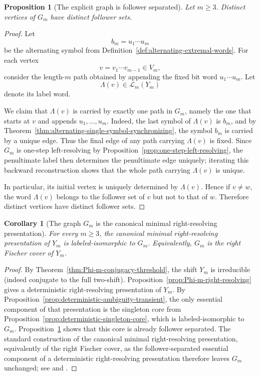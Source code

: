 \documentclass[11pt,letterpaper]{article}
\numberwithin{equation}{section}
\theoremstyle{plain}
\newtheorem{proposition}[theorem]{Proposition}
\newtheorem{corollary}[theorem]{Corollary}
\theoremstyle{definition}
\theoremstyle{remark}
\begin{document}
\begin{proposition}[The explicit graph is follower separated]
\label{prop:G-m-follower-separated}
Let $m\ge 3$.  Distinct vertices of $G_m$ have distinct follower sets.
\end{proposition}

\begin{proof}
Let
\[
b_m=u_1\cdots u_m
\]
be the alternating symbol from
Definition~\ref{def:alternating-extremal-words}.  For each vertex
\[
v=v_1\cdots v_{m-1}\in V_m,
\]
consider the length-$m$ path obtained by appending the fixed bit word
$u_1\cdots u_m$.  Let
\[
\Lambda(v)\in\mathcal L_m(Y_m)
\]
denote its label word.

We claim that $\Lambda(v)$ is carried by exactly one path in $G_m$, namely the
one that starts at $v$ and appends $u_1,\ldots,u_m$.  Indeed, the last symbol
of $\Lambda(v)$ is $b_m$, and by
Theorem~\ref{thm:alternating-single-symbol-synchronizing}, the symbol $b_m$ is
carried by a unique edge.  Thus the final edge of any path carrying
$\Lambda(v)$ is fixed.  Since $G_m$ is one-step left-resolving by
Proposition~\ref{prop:one-step-left-resolving}, the penultimate label then
determines the penultimate edge uniquely; iterating this backward reconstruction
shows that the whole path carrying $\Lambda(v)$ is unique.

In particular, its initial vertex is uniquely determined by $\Lambda(v)$.
Hence if $v\neq w$, the word $\Lambda(v)$ belongs to the follower set of $v$
but not to that of $w$.  Therefore distinct vertices have distinct follower
sets.
\end{proof}

\begin{corollary}[The graph $G_m$ is the canonical minimal right-resolving presentation]
\label{cor:G-m-fischer-cover}
For every $m\ge 3$, the canonical minimal right-resolving presentation of
$Y_m$ is labeled-isomorphic to $G_m$.  Equivalently, $G_m$ is the right
Fischer cover of $Y_m$.
\end{corollary}

\begin{proof}
By Theorem~\ref{thm:Phi-m-conjugacy-threshold}, the shift $Y_m$ is irreducible
(indeed conjugate to the full two-shift).  Proposition~\ref{prop:Phi-m-right-resolving}
gives a deterministic right-resolving presentation of $Y_m$.  By
Proposition~\ref{prop:deterministic-ambiguity-transient}, the only essential
component of that presentation is the singleton core from
Proposition~\ref{prop:deterministic-singleton-core}, which is labeled-isomorphic
to $G_m$.  Proposition~\ref{prop:G-m-follower-separated} shows that this core is
already follower separated.  The standard construction of the canonical
minimal right-resolving presentation, equivalently of the right Fischer cover,
as the follower-separated essential component of a deterministic
right-resolving presentation therefore leaves $G_m$ unchanged; see
\cite[Chs.~3--4]{LindMarcus1995} and \cite[Ch.~4]{Kitchens1998SymbolicDynamics}.
\end{proof}
\end{document}
